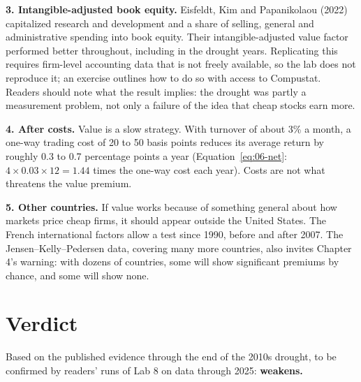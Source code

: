 \textbf{3. Intangible-adjusted book equity.} Eisfeldt, Kim and Papanikolaou (2022) capitalized research and development and a share of selling, general and administrative spending into book equity. Their intangible-adjusted value factor performed better throughout, including in the drought years. Replicating this requires firm-level accounting data that is not freely available, so the lab does not reproduce it; an exercise outlines how to do so with access to Compustat. Readers should note what the result implies: the drought was partly a measurement problem, not only a failure of the idea that cheap stocks earn more.

\textbf{4. After costs.} Value is a slow strategy. With turnover of about 3\% a month, a one-way trading cost of 20 to 50 basis points reduces its average return by roughly 0.3 to 0.7 percentage points a year (Equation~\eqref{eq:06-net}: $4 \times 0.03 \times 12 = 1.44$ times the one-way cost each year). Costs are not what threatens the value premium.

\textbf{5. Other countries.} If value works because of something general about how markets price cheap firms, it should appear outside the United States. The French international factors allow a test since 1990, before and after 2007. The Jensen--Kelly--Pedersen data, covering many more countries, also invites Chapter 4's warning: with dozens of countries, some will show significant premiums by chance, and some will show none.

\section{Verdict}
\label{sec:08-verdict}

Based on the published evidence through the end of the 2010s drought, to be confirmed by readers' runs of Lab 8 on data through 2025: \textbf{weakens.}

